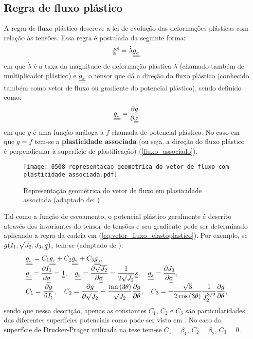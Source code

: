 \subsection{Regra de fluxo plástico}

A regra de fluxo plástico descreve a lei de evolução das deformações plásticas com relação às tensões. Essa regra é postulada da seguinte forma:
\begin{equation}
	\label{eq:fluxo_elastoplastico}
	\dot {\underline{\underline \varepsilon}}^p = \dot \lambda \underline{\underline {g_{_\sigma}}}
\end{equation}
em que $\dot \lambda$ é a taxa da magnitude de deformação plástica $\lambda$ (chamado também de multiplicador plástico) e $\underline{\underline {g_{_\sigma}}}$ o tensor que dá a direção do fluxo plástico (conhecido também como vetor de fluxo ou gradiente do potencial plástico), sendo definido como:
\begin{equation}
	\label{eq:vetor_fluxo_elastoplastico}
	\underline{\underline {g_{_\sigma}}} = \dfrac{\partial g}{\partial \underline{\underline \sigma}}
\end{equation}
em que $g$ é uma função análoga a $f$ chamada de potencial plástico. No caso em que $g=f$ tem-se a \textbf{plasticidade associada} (ou seja, a direção do fluxo plástico é perpendicular à superfície de plastificação) (\autoref{fluxo_associado}).
\begin{figure}[H]
	\begin{center}
		\texttt{[image: 0508-representacao geometrica do vetor de fluxo com plasticidade associada.pdf]}
	\end{center}
	\caption{\label{fluxo_associado}Representação geométrica do vetor de fluxo em plasticidade associada (adaptado de: )}
\end{figure}
Tal como a função de escoamento, o potencial plástico geralmente é descrito através dos invariantes do tensor de tensões e seu gradiente pode ser determinado aplicando a regra da cadeia em (\ref{eq:vetor_fluxo_elastoplastico}). Por exemplo, se $g(I_1,\sqrt{J_2},J_3,\underline q)$, tem-se (adaptado de ):
\begin{equation}
	\label{eq:invariantes_tensores}
	\begin{array}{lcl}
		\underline{\underline {g_{_\sigma}}} = C_1\underline{\underline {g_{_1}}} + C_2\underline{\underline {g_{_2}}} + C_3\underline{\underline {g_{_3}}}, \\ 
		\underline{\underline {g_{_1}}} = \dfrac{\partial I_1}{\partial \underline{\underline \sigma}} = \underline{\underline 1},~~~ \underline{\underline {g_{_2}}} = \dfrac{\partial \sqrt{J_2}}{\partial \underline{\underline \sigma}} = \dfrac{1}{2\sqrt{J_2}}\underline{\underline s},~~~ \underline{\underline {g_{_3}}} = \dfrac{\partial J_3}{\partial \underline{\underline \sigma}}, \\
		C_1 = \dfrac{\partial g}{\partial I_1},~~~C_2=\dfrac{\partial g}{\partial \sqrt{J_2}}-\dfrac{\tan{(3\theta)}}{\sqrt{J_2}}\dfrac{\partial g}{\partial \theta},~~~C_3 = -\dfrac{\sqrt{3}}{2\cos{(3\theta})}\dfrac{1}{J_2^{3/2}}\dfrac{\partial g}{\partial \theta},
	\end{array}
\end{equation}
sendo que nessa descrição, apenas as constantes $C_1$, $C_2$  e $C_3$ são particularidades das diferentes superfícies potenciais como pode ser visto em . No caso da superfície de Drucker-Prager utilizada na tese tem-se $C_1 = \beta_1$, $C_2 = \beta_2$, $C_3 = 0$. 

